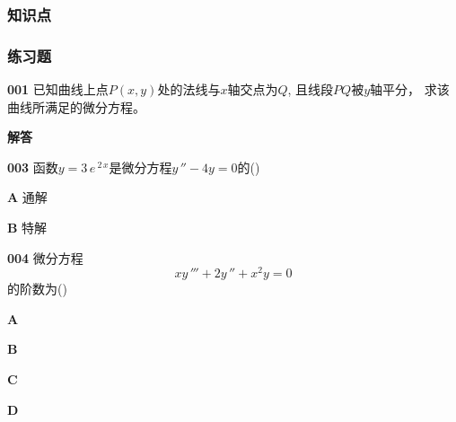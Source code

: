 \documentclass[a4paper,10pt]{article} %
\begin{document}
\subsubsection{知识点}
\subsubsection{练习题}



\textheight
\par\noindent \textbf{001} \quad 已知曲线上点$P(x,y)$处的法线与$x$轴交点为$Q$, 
且线段$PQ$被$y$轴平分， 求该曲线所满足的微分方程。 
\par\noindent \textbf{解答}


\textheight

\par\noindent \textbf{003} \quad 函数$y=3\,e\,^{2\,x}$是微分方程$y\,''-4y=0$的\hfil (\quad\quad\quad)%
\par\noindent \textbf{A} \quad  通解
\par\noindent \textbf{B} \quad  特解





\textheight

\newpage
\par\noindent \textbf{004} \quad 微分方程
$$
xy\,'''+2y\,''+x^2y=0
$$
的阶数为\hfill (\quad\quad\quad)
\par\noindent \textbf{A} 
\par\noindent \textbf{B} 
\par\noindent \textbf{C} 
\par\noindent \textbf{D} 
\end{document}
